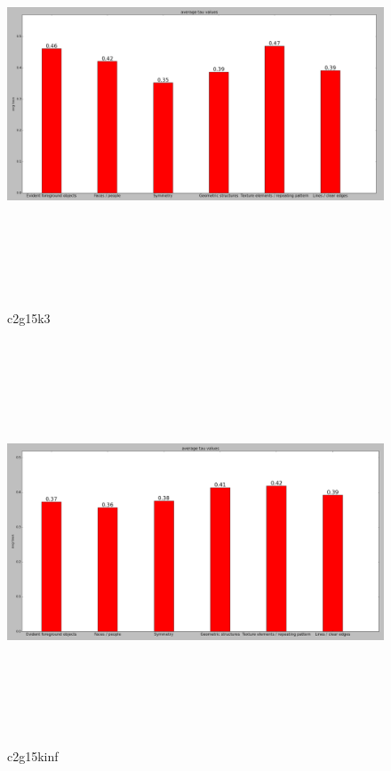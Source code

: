 	
		
		\begin{figure}[h] \label{c2g15k3}
			\includegraphics[width=\linewidth,height=12cm,keepaspectratio]{Figures/c2g15k3}
			\caption[c2g15k3]
			{c2g15k3}
		\end{figure}
		
		\begin{figure}[h] \label{c2g15kinf}
			\includegraphics[width=\linewidth,height=12cm,keepaspectratio]{Figures/c2g15kinf}
			\caption[c2g15kinf]
			{c2g15kinf}
		\end{figure}
